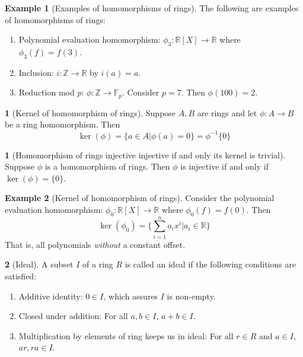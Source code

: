 \documentclass[12pt]{article}
\theoremstyle{definition}
\newtheorem{definition}{\color{NavyBlue}{\textbf{Definition}}}
\newtheorem{theorem}{\color{ForestGreen}{\textbf{Theorem}}}
\newcommand{\R}{\mathbb{R}}
\newcommand{\Z}{\mathbb{Z}}
\newtheorem{example}{\color{WildStrawberry}Example}
\theoremstyle{definition}
\begin{document}
\begin{example}[Examples of homomorphisms of rings]
	The following are examples of homomorphisms of rings:
	\begin{enumerate}
		\item Polynomial evaluation homomorphism: $\phi_3:\R[X] \to \R$ where $\phi_3(f) = f(3)$.
		\item Inclusion: $i: \Z \to \R$ by $i(a) = a$. 
		\item Reduction mod $p$: $\phi : \Z \to \mathbb{F}_p$. Consider $p=7$. Then $\phi(100) = 2$.
	\end{enumerate}
\end{example}

\begin{definition}[Kernel of homomorphism of rings]
	Suppose $A,B$ are rings and let $\phi:A \to B$ be a ring homomorphism. Then
	\begin{equation}
		\ker(\phi) = \{a \in A | \phi(a) = 0\} = \phi^{-1}\{0\}
	\end{equation}
\end{definition}

\begin{theorem}[Homomorphism of rings injective injective if and only its kernel is trivial]
	Suppose $\phi$ is a homomorphism of rings. Then $\phi$ is injective if and only if $\ker(\phi) = \{0\}$.
\end{theorem}

\begin{example}[Kernel of homomorphism of rings]
	Consider the polynomial evaluation homomorphism: $\phi_0:\R[X] \to \R$ where $\phi_0(f) = f(0)$. Then
	\begin{equation}
		\ker(\phi_0) = \{\sum_{i=1}^n a_i x^i | a_i \in \R \}
	\end{equation}
	That is, all polynomials \emph{without} a constant offset.
\end{example}

\begin{definition}[Ideal]
	A subset $I$ of a ring $R$ is called an ideal if the following conditions are satisfied:
	\begin{enumerate}
		\item Additive identity: $0 \in I$, which assures $I$ is non-empty.
		\item Closed under addition: For all $a,b \in I$, $a+b \in I$.
		\item Multiplication by elements of ring keeps us in ideal: For all $r \in R$ and $a \in I$, $ar, ra \in I$. 
	\end{enumerate}
\end{definition}
\end{document}
